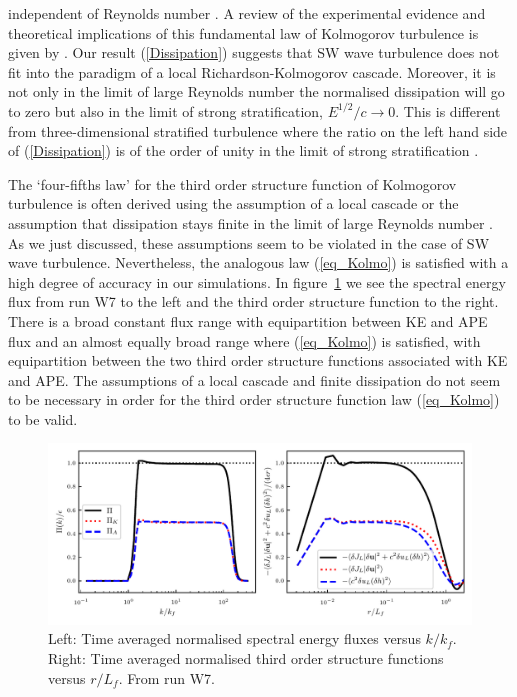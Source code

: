 \documentclass{jfm}
\begin{document}
independent of Reynolds number \cite[]{Pope, TennekesLumley}. A review of the
experimental evidence and theoretical implications of this fundamental law of
Kolmogorov turbulence is given by \cite{Vassilicos2015}. Our result
(\ref{Dissipation}) suggests that SW wave turbulence does not fit into the
paradigm of a local Richardson-Kolmogorov cascade. Moreover, it is not only in
the limit of large Reynolds number the normalised dissipation will go to zero
but also in the limit of strong stratification, $ E^{1/2}/c \rightarrow 0 $.
This is different from three-dimensional stratified turbulence where the ratio
on the left hand side of (\ref{Dissipation}) is of the order of unity in the
limit of strong stratification \cite[]{Lindborg2006, Brethouwer2007}.


The `four-fifths law' for the third order structure function of Kolmogorov
turbulence is often derived using the assumption of a local cascade
\cite[]{Vassilicos2015} or the assumption that dissipation stays finite in the
limit of large Reynolds number \cite[]{Frisch}. As we just discussed, these
assumptions seem to be violated in the case of SW wave turbulence.
Nevertheless, the analogous law (\ref{eq_Kolmo}) is satisfied with a high degree of accuracy in our simulations. In
figure~\ref{Flux} we see the spectral energy flux from run W7 to the left and
the third order structure function to the right. There is a broad constant flux
range with equipartition between KE and APE flux and an almost equally broad
range where (\ref{eq_Kolmo}) is satisfied, with equipartition between the two
third order structure functions associated with KE and APE. The assumptions of
a local cascade and finite dissipation do not seem to be necessary in order for
the third order structure function law (\ref{eq_Kolmo}) to be valid.



\begin{figure}
\centerline{\includegraphics[width=5.8in]{../Pyfig/fig_flux_struct_combined}}
\caption{Left: Time averaged normalised spectral energy fluxes versus $ k/k_f
$. Right: Time averaged normalised third order structure functions versus $
r/L_f $. From run W7. }
\label{Flux}
\end{figure}
\end{document}
